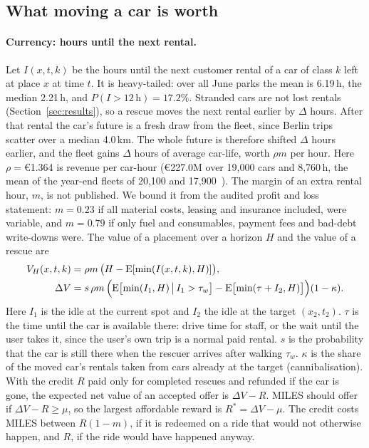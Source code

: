 \documentclass[11pt,a4paper]{article}
\newcommand{\eur}[1]{\euro{}#1}
\begin{document}
\subsection{What moving a car is worth}

\paragraph{Currency: hours until the next rental.}
Let $I(x,t,k)$ be the hours until the next customer rental of a car of class $k$ left at place $x$ at time $t$. It is heavy-tailed: over all June parks the mean is 6.19\,h, the median 2.21\,h, and $P(I>12\,\mathrm{h})=17.2\%$. Stranded cars are not lost rentals (Section~\ref{sec:results}), so a rescue moves the next rental earlier by $\Delta$ hours. After that rental the car's future is a fresh draw from the fleet, since Berlin trips scatter over a median 4.0\,km. The whole future is therefore shifted $\Delta$ hours earlier, and the fleet gains $\Delta$ hours of average car-life, worth $\rho m$ per hour. Here $\rho={}$\eur{1.364} is revenue per car-hour (\eur{227.0}M over 19,000 cars and 8,760\,h, the mean of the year-end fleets of 20,100 and 17,900~\citep{miles2024annual}). The margin of an extra rental hour, $m$, is not published. We bound it from the audited profit and loss statement: $m=0.23$ if all material costs, leasing and insurance included, were variable, and $m=0.79$ if only fuel and consumables, payment fees and bad-debt write-downs were. The value of a placement over a horizon $H$ and the value of a rescue are
\begin{align}
V_H(x,t,k) &= \rho m\,\bigl(H-\mathrm{E}[\min(I(x,t,k),H)]\bigr),\\
\Delta V &= s\,\rho m\,\Bigl(\mathrm{E}\bigl[\min(I_1,H)\,\big|\,I_1>\tau_w\bigr]-\mathrm{E}\bigl[\min(\tau+I_2,H)\bigr]\Bigr)(1-\kappa).
\end{align}
Here $I_1$ is the idle at the current spot and $I_2$ the idle at the target $(x_2,t_2)$. $\tau$ is the time until the car is available there: drive time for staff, or the wait until the user takes it, since the user's own trip is a normal paid rental. $s$ is the probability that the car is still there when the rescuer arrives after walking $\tau_w$. $\kappa$ is the share of the moved car's rentals taken from cars already at the target (cannibalisation). With the credit $R$ paid only for completed rescues and refunded if the car is gone, the expected net value of an accepted offer is $\Delta V-R$. MILES should offer if $\Delta V-R\ge\mu$, so the largest affordable reward is $R^\ast=\Delta V-\mu$. The credit costs MILES between $R(1-m)$, if it is redeemed on a ride that would not otherwise happen, and $R$, if the ride would have happened anyway.
\end{document}

